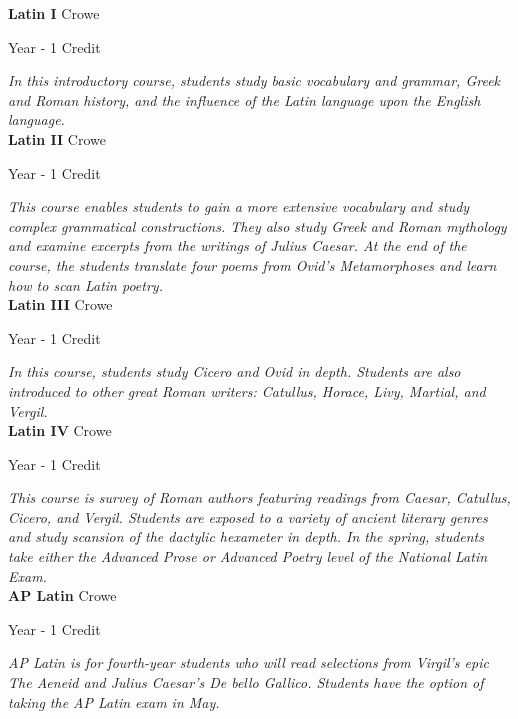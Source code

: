 \noindent\textbf{Latin I} \hfill Crowe

\noindent Year - 1 Credit

\vspace{1mm}\emph{In this introductory course, students study basic vocabulary and grammar, Greek and Roman history, and the influence of the Latin language upon the English language.}\\

\noindent\textbf{Latin II} \hfill Crowe

\noindent Year - 1 Credit

\vspace{1mm}\emph{This course enables students to gain a more extensive vocabulary and study complex grammatical constructions.  They also study Greek and Roman mythology and examine excerpts from the writings of Julius Caesar.  At the end of the course, the students translate four poems from Ovid’s Metamorphoses and learn how to scan Latin poetry.}\\

\noindent\textbf{Latin III} \hfill Crowe

\noindent Year - 1 Credit

\vspace{1mm}\emph{In this course, students study Cicero and Ovid in depth.  Students are also introduced to other great Roman writers: Catullus, Horace, Livy, Martial, and Vergil.}\\

\noindent\textbf{Latin IV} \hfill Crowe

\noindent Year - 1 Credit

\vspace{1mm}\emph{This course is survey of Roman authors featuring readings from Caesar, Catullus, Cicero, and Vergil. Students are exposed to a variety of ancient literary genres and study scansion of the dactylic hexameter in depth. In the spring, students take either the Advanced Prose or Advanced Poetry level of the National Latin Exam.}\\

\noindent\textbf{AP Latin} \hfill Crowe

\noindent Year - 1 Credit

\vspace{1mm}\emph{AP Latin is for fourth-year students who will read selections from Virgil's epic The Aeneid and Julius Caesar's De bello Gallico. Students have the option of taking the AP Latin exam in May.}\\

